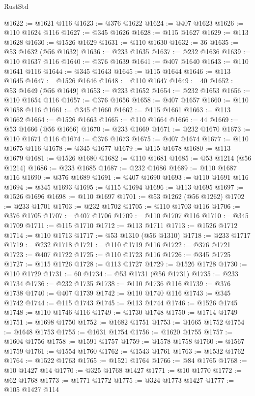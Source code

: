 \begin{lexlean}{RustStd}
\begin{coremodule}
{\begin{coremodule}
{{{{{{{{{{{{{{{{{{{{{{{{{{{{{{{{{{{{{{{{{{{{{{{@1622 := @1621 @116
@1623 := @376 @1622
@1624 := @407 @1623
@1626 := @110 @1624 @116
@1627 := @345 @1626
@1628 := @115 @1627
@1629 := @113 @1628
@1630 := @1526 @1629
@1631 := @110 @1630
@1632 := 36
@1635 := @53 @1632 (@56 @1632)
@1636 := @233 @1635
@1637 := @232 @1636
@1639 := @110 @1637 @116
@1640 := @376 @1639
@1641 := @407 @1640
@1643 := @110 @1641 @116
@1644 := @345 @1643
@1645 := @115 @1644
@1646 := @113 @1645
@1647 := @1526 @1646
@1648 := @110 @1647
@1649 := 40
@1652 := @53 @1649 (@56 @1649)
@1653 := @233 @1652
@1654 := @232 @1653
@1656 := @110 @1654 @116
@1657 := @376 @1656
@1658 := @407 @1657
@1660 := @110 @1658 @116
@1661 := @345 @1660
@1662 := @115 @1661
@1663 := @113 @1662
@1664 := @1526 @1663
@1665 := @110 @1664
@1666 := 44
@1669 := @53 @1666 (@56 @1666)
@1670 := @233 @1669
@1671 := @232 @1670
@1673 := @110 @1671 @116
@1674 := @376 @1673
@1675 := @407 @1674
@1677 := @110 @1675 @116
@1678 := @345 @1677
@1679 := @115 @1678
@1680 := @113 @1679
@1681 := @1526 @1680
@1682 := @110 @1681
@1685 := @53 @1214 (@56 @1214)
@1686 := @233 @1685
@1687 := @232 @1686
@1689 := @110 @1687 @116
@1690 := @376 @1689
@1691 := @407 @1690
@1693 := @110 @1691 @116
@1694 := @345 @1693
@1695 := @115 @1694
@1696 := @113 @1695
@1697 := @1526 @1696
@1698 := @110 @1697
@1701 := @53 @1262 (@56 @1262)
@1702 := @233 @1701
@1703 := @232 @1702
@1705 := @110 @1703 @116
@1706 := @376 @1705
@1707 := @407 @1706
@1709 := @110 @1707 @116
@1710 := @345 @1709
@1711 := @115 @1710
@1712 := @113 @1711
@1713 := @1526 @1712
@1714 := @110 @1713
@1717 := @53 @1310 (@56 @1310)
@1718 := @233 @1717
@1719 := @232 @1718
@1721 := @110 @1719 @116
@1722 := @376 @1721
@1723 := @407 @1722
@1725 := @110 @1723 @116
@1726 := @345 @1725
@1727 := @115 @1726
@1728 := @113 @1727
@1729 := @1526 @1728
@1730 := @110 @1729
@1731 := 60
@1734 := @53 @1731 (@56 @1731)
@1735 := @233 @1734
@1736 := @232 @1735
@1738 := @110 @1736 @116
@1739 := @376 @1738
@1740 := @407 @1739
@1742 := @110 @1740 @116
@1743 := @345 @1742
@1744 := @115 @1743
@1745 := @113 @1744
@1746 := @1526 @1745
@1748 := @110 @1746 @116
@1749 := @1730 @1748
@1750 := @1714 @1749
@1751 := @1698 @1750
@1752 := @1682 @1751
@1753 := @1665 @1752
@1754 := @1648 @1753
@1755 := @1631 @1754
@1756 := @1620 @1755
@1757 := @1604 @1756
@1758 := @1591 @1757
@1759 := @1578 @1758
@1760 := @1567 @1759
@1761 := @1554 @1760
@1762 := @1543 @1761
@1763 := @1532 @1762
@1764 := @1522 @1763
@1765 := @1521 @1764
@1766 := @84 @1765
@1768 := @10 @1427 @14
@1770 := @325 @1768 @1427
@1771 := @10 @1770
@1772 := @62 @1768
@1773 := @1771 @1772
@1775 := @324 @1773 @1427
@1777 := @105 @1427 @114
}}}}}}}}}}}}}}}}}}}}}}}}}}}}}}}}}}}}}}}}}}}}}}}
\end{coremodule}}
\end{coremodule}
\end{lexlean}
